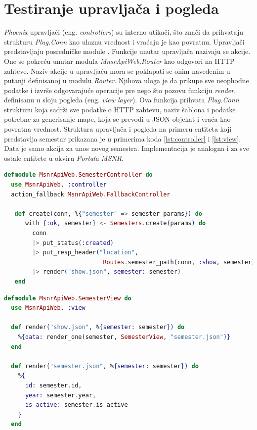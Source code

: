 \documentclass[12pt,oneside]{memoir}
\begin{document}
\section{Testiranje upravljača i pogleda}

\par \emph{Phoenix} upravljači (eng. \emph{controllers}) su interno utikači, što znači da prihvataju strukturu \emph{Plug.Conn} kao ulaznu vrednost i vraćaju je kao povratnu. Upravljači  predstavljaju posredničke module \cite{hexcontrol}. Funkcije unutar upravljača nazivaju se akcije. One se pokreću unutar modula \emph{MnsrApiWeb.Router} kao odgovori na HTTP zahteve. Naziv akcije u upravljaču mora se poklapati se onim navedenim u putanji definisanoj u modulu \emph{Router}. Njihova uloga je da prikupe sve neophodne podatke i izvrše odgovarajuće operacije pre nego što 
pozovu funkciju \emph{render}, definisanu u sloju pogleda (eng. \emph{view layer}). Ova funkcija prihvata \emph{Plug.Conn} strukturu koja sadrži sve podatke o HTTP zahtevu, naziv šablona i podatke potrebne za generisanje mape, koja se prevodi u JSON objekat i vraća kao povratna vrednost. Struktura upravljača i pogleda na primeru entiteta koji predstavlja semestar prikazana je u primerima koda \ref{lst:controller} i \ref{lst:view}. Data je samo akcija za unos novog semestra. Implementacija je analogna i za sve ostale entitete u okviru \emph{Portala MSNR}.\\


\begin{minipage}{\linewidth}
\begin{lstlisting}[language=elixir, basicstyle=\small, caption={Struktura upravljača \emph{SemesterController}},captionpos=b, label={lst:controller}]
defmodule MsnrApiWeb.SemesterController do
  use MsnrApiWeb, :controller
  action_fallback MsnrApiWeb.FallbackController

   def create(conn, %{"semester" => semester_params}) do
      with {:ok, semester} <- Semesters.create(params) do
        conn
        |> put_status(:created)
        |> put_resp_header("location", 
        					Routes.semester_path(conn, :show, semester))
        |> render("show.json", semester: semester)
   end
\end{lstlisting}
\end{minipage}


\begin{minipage}{\linewidth}
\begin{lstlisting}[language=elixir, basicstyle=\small, caption={Struktura pogleda \emph{SemesterView}},captionpos=b, label={lst:view}]
defmodule MsnrApiWeb.SemesterView do
  use MsnrApiWeb, :view

  def render("show.json", %{semester: semester}) do
    %{data: render_one(semester, SemesterView, "semester.json")}
  end
  
  def render("semester.json", %{semester: semester}) do
    %{
      id: semester.id,
      year: semester.year,
      is_active: semester.is_active
    } 
  end
\end{lstlisting}
\end{minipage}
\end{document}
